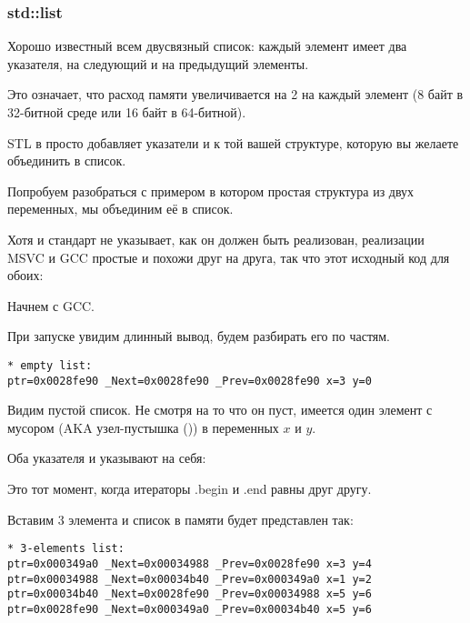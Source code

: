 \subsubsection{std::list}
\label{std_list}

Хорошо известный всем двусвязный список: каждый элемент имеет два указателя, на следующий и на предыдущий
элементы.

Это означает, что расход памяти увеличивается на 2  на каждый элемент (8 байт в 32-битной среде или
16 байт в 64-битной).

STL в \Cpp просто добавляет указатели  и  к той вашей структуре, которую вы желаете объединить в список.

Попробуем разобраться с примером в котором простая структура из двух переменных, мы объединим её в список.

Хотя и стандарт \Cpp не указывает, как он должен быть реализован, реализации
MSVC и GCC простые и похожи друг на друга, так что этот исходный код для обоих:




Начнем с GCC.

При запуске увидим длинный вывод, будем разбирать его по частям.

\begin{lstlisting}
* empty list:
ptr=0x0028fe90 _Next=0x0028fe90 _Prev=0x0028fe90 x=3 y=0
\end{lstlisting}

Видим пустой список.
Не смотря на то что он пуст, имеется один элемент с мусором (\ac{AKA} узел-пустышка ()) 
в переменных $x$ и $y$.

Оба указателя  и  указывают на себя:



Это тот момент, когда итераторы .begin и .end равны друг другу.

Вставим 3 элемента и список в памяти будет представлен так:

\begin{lstlisting}
* 3-elements list:
ptr=0x000349a0 _Next=0x00034988 _Prev=0x0028fe90 x=3 y=4
ptr=0x00034988 _Next=0x00034b40 _Prev=0x000349a0 x=1 y=2
ptr=0x00034b40 _Next=0x0028fe90 _Prev=0x00034988 x=5 y=6
ptr=0x0028fe90 _Next=0x000349a0 _Prev=0x00034b40 x=5 y=6
\end{lstlisting}

